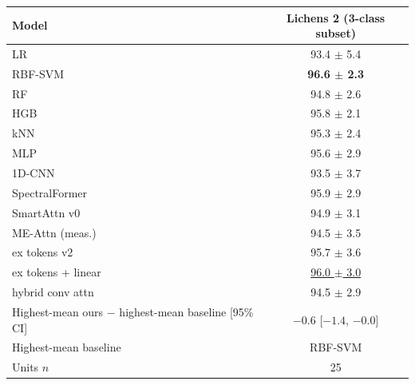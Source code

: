\small
\begin{tabular}{lc}
\toprule
Model & Lichens 2 (3-class subset) \\
\midrule
LR & 93.4 $\pm$ 5.4 \\
RBF-SVM & \textbf{96.6 $\pm$ 2.3} \\
RF & 94.8 $\pm$ 2.6 \\
HGB & 95.8 $\pm$ 2.1 \\
kNN & 95.3 $\pm$ 2.4 \\
MLP & 95.6 $\pm$ 2.9 \\
1D-CNN & 93.5 $\pm$ 3.7 \\
SpectralFormer & 95.9 $\pm$ 2.9 \\
\midrule
SmartAttn v0 & 94.9 $\pm$ 3.1 \\
ME-Attn (meas.) & 94.5 $\pm$ 3.5 \\
ex tokens v2 & 95.7 $\pm$ 3.6 \\
ex tokens + linear & \underline{96.0 $\pm$ 3.0} \\
hybrid conv attn & 94.5 $\pm$ 2.9 \\
\midrule
Highest-mean ours $-$ highest-mean baseline [95\% CI] & $-0.6$ [$-1.4$, $-0.0$] \\
Highest-mean baseline & RBF-SVM \\
\midrule
Units $n$ & 25 \\
\bottomrule
\end{tabular}
